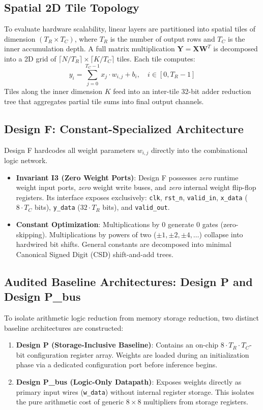 \documentclass[11pt,a4paper]{article}
\begin{document}
\subsection{Spatial 2D Tile Topology}
To evaluate hardware scalability, linear layers are partitioned into spatial tiles of dimension $(T_R \times T_C)$, where $T_R$ is the number of output rows and $T_C$ is the inner accumulation depth. A full matrix multiplication $\mathbf{Y} = \mathbf{X}\mathbf{W}^T$ is decomposed into a 2D grid of $\lceil N/T_R \rceil \times \lceil K/T_C \rceil$ tiles. Each tile computes:
\begin{equation}
y_{i} = \sum_{j=0}^{T_C-1} x_j \cdot w_{i,j} + b_i, \quad i \in [0, T_R-1]
\end{equation}
Tiles along the inner dimension $K$ feed into an inter-tile 32-bit adder reduction tree that aggregates partial tile sums into final output channels.

\subsection{Design F: Constant-Specialized Architecture}
Design F hardcodes all weight parameters $w_{i,j}$ directly into the combinational logic network.
\begin{itemize}
    \item \textbf{Invariant I3 (Zero Weight Ports)}: Design F possesses \textit{zero} runtime weight input ports, \textit{zero} weight write buses, and \textit{zero} internal weight flip-flop registers. Its interface exposes exclusively: \texttt{clk}, \texttt{rst\_n}, \texttt{valid\_in}, \texttt{x\_data} ($8 \cdot T_C$ bits), \texttt{y\_data} ($32 \cdot T_R$ bits), and \texttt{valid\_out}.
    \item \textbf{Constant Optimization}: Multiplications by 0 generate 0 gates (zero-skipping). Multiplications by powers of two ($\pm 1, \pm 2, \pm 4, \dots$) collapse into hardwired bit shifts. General constants are decomposed into minimal Canonical Signed Digit (CSD) shift-and-add trees.
\end{itemize}

\subsection{Audited Baseline Architectures: Design P and Design P\_bus}
To isolate arithmetic logic reduction from memory storage reduction, two distinct baseline architectures are constructed:
\begin{enumerate}
    \item \textbf{Design P (Storage-Inclusive Baseline)}: Contains an on-chip $8 \cdot T_R \cdot T_C$-bit configuration register array. Weights are loaded during an initialization phase via a dedicated configuration port before inference begins.
    \item \textbf{Design P\_bus (Logic-Only Datapath)}: Exposes weights directly as primary input wires (\texttt{w\_data}) without internal register storage. This isolates the pure arithmetic cost of generic $8 \times 8$ multipliers from storage registers.
\end{enumerate}
\end{document}
